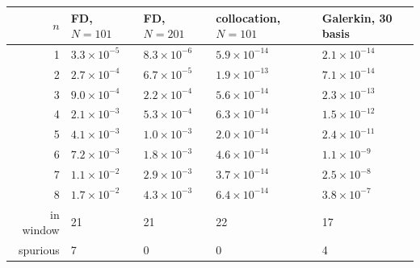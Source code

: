 \begin{tabular}{rllll}
\toprule
$n$ & FD, $N=101$ & FD, $N=201$ & collocation, $N=101$ & Galerkin, 30 basis\\
\midrule
1 & $3.3\times10^{-5}$ & $8.3\times10^{-6}$ & $5.9\times10^{-14}$ & $2.1\times10^{-14}$\\
2 & $2.7\times10^{-4}$ & $6.7\times10^{-5}$ & $1.9\times10^{-13}$ & $7.1\times10^{-14}$\\
3 & $9.0\times10^{-4}$ & $2.2\times10^{-4}$ & $5.6\times10^{-14}$ & $2.3\times10^{-13}$\\
4 & $2.1\times10^{-3}$ & $5.3\times10^{-4}$ & $6.3\times10^{-14}$ & $1.5\times10^{-12}$\\
5 & $4.1\times10^{-3}$ & $1.0\times10^{-3}$ & $2.0\times10^{-14}$ & $2.4\times10^{-11}$\\
6 & $7.2\times10^{-3}$ & $1.8\times10^{-3}$ & $4.6\times10^{-14}$ & $1.1\times10^{-9}$\\
7 & $1.1\times10^{-2}$ & $2.9\times10^{-3}$ & $3.7\times10^{-14}$ & $2.5\times10^{-8}$\\
8 & $1.7\times10^{-2}$ & $4.3\times10^{-3}$ & $6.4\times10^{-14}$ & $3.8\times10^{-7}$\\
\midrule
in window & 21 & 21 & 22 & 17\\
spurious & 7 & 0 & 0 & 4\\
\bottomrule
\end{tabular}
